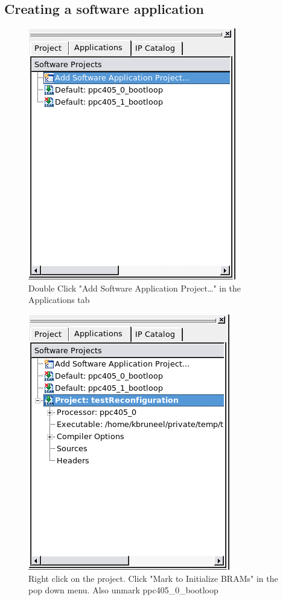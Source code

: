 \documentclass[a4paper,oneside]{memoir}
\begin{document}
\subsection{Creating a software application}
\begin{figure}[H]
\centering
\includegraphics[scale=0.5]{soft1}
\caption{Double Click "Add Software Application Project\dots" in the Applications tab\label{fig:soft1}}
\end{figure}
\begin{figure}[H]
\centering
\includegraphics[scale=0.5]{soft2}
\caption{Right click  on the project. Click "Mark to Initialize BRAMs" in the pop down menu. Also unmark ppc405\_0\_bootloop\label{fig:soft2}}
\end{figure}
\end{document}
